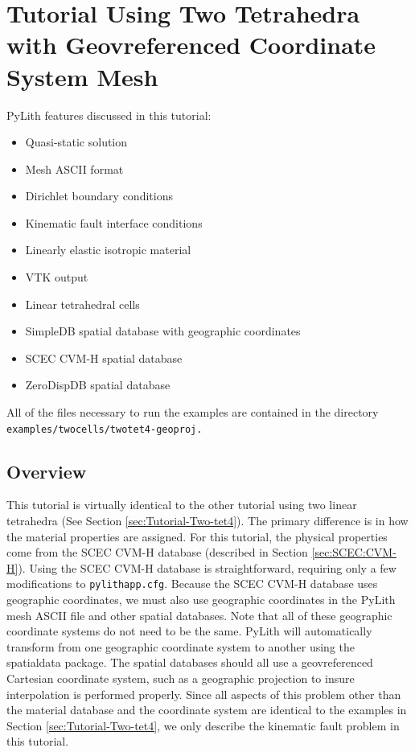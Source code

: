 
\section{\label{sec:examples:twotet4-geoproj}Tutorial Using Two Tetrahedra
with Geovreferenced Coordinate System Mesh}

PyLith features discussed in this tutorial:
\begin{itemize}
\item Quasi-static solution
\item Mesh ASCII format
\item Dirichlet boundary conditions
\item Kinematic fault interface conditions
\item Linearly elastic isotropic material
\item VTK output
\item Linear tetrahedral cells
\item SimpleDB spatial database with geographic coordinates
\item SCEC CVM-H spatial database
\item ZeroDispDB spatial database
\end{itemize}
All of the files necessary to run the examples are contained in the
directory \texttt{examples/twocells/twotet4-geoproj.}


\subsection{Overview}

This tutorial is virtually identical to the other tutorial using two
linear tetrahedra (See Section \vref{sec:Tutorial-Two-tet4}). The
primary difference is in how the material properties are assigned.
For this tutorial, the physical properties come from the SCEC CVM-H
database (described in Section \vref{sec:SCEC:CVM-H}). Using the
SCEC CVM-H database is straightforward, requiring only a few modifications
to \texttt{pylithapp.cfg}. Because the SCEC CVM-H database uses geographic
coordinates, we must also use geographic coordinates in the PyLith
mesh ASCII file and other spatial databases. Note that all of these
geographic coordinate systems do not need to be the same. PyLith will
automatically transform from one geographic coordinate system to another
using the spatialdata package. The spatial databases should all use
a geovreferenced Cartesian coordinate system, such as a geographic
projection to insure interpolation is performed properly. Since all
aspects of this problem other than the material database and the coordinate
system are identical to the examples in Section \vref{sec:Tutorial-Two-tet4},
we only describe the kinematic fault problem in this tutorial.


